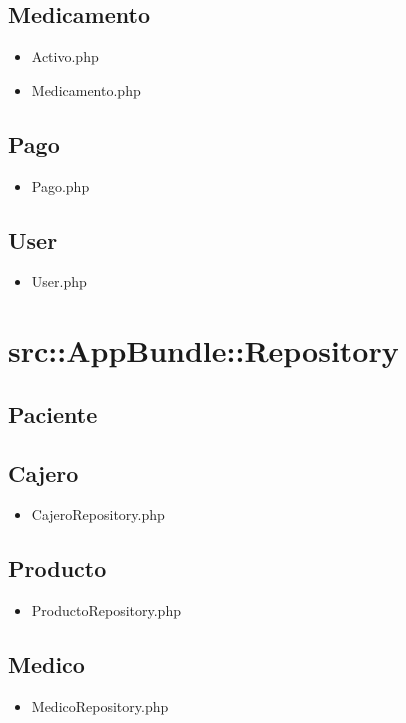 		\subsection{Medicamento}
		\begin{itemize}
			\item Activo.php
			\item Medicamento.php
		\end{itemize}
		\subsection{Pago}
		\begin{itemize}
			\item Pago.php
		\end{itemize}
		\subsection{User}
		\begin{itemize}
			\item User.php
		\end{itemize}
		
\section{src::AppBundle::Repository}
	
	\subsection{Paciente}
		\subsection{Cajero}
		\begin{itemize}
			\item CajeroRepository.php
		\end{itemize}
		\subsection{Producto}
		\begin{itemize}
			\item ProductoRepository.php
		\end{itemize}
		\subsection{Medico}
		\begin{itemize}
			\item MedicoRepository.php
		\end{itemize}

